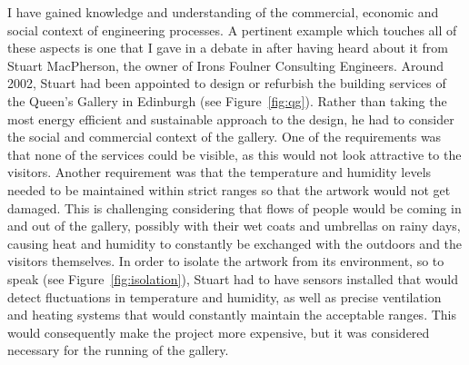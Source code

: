I have gained knowledge and understanding of the commercial, economic and social context of engineering processes.
A pertinent example which touches all of these aspects is one that I gave in a debate in \IDTitle \space after having heard about it from Stuart MacPherson, the owner of Irons Foulner Consulting Engineers.
Around 2002, Stuart had been appointed to design or refurbish the building services of the Queen's Gallery in Edinburgh (see Figure~\ref{fig:qg}).
Rather than taking the most energy efficient and sustainable approach to the design, he had to consider the social and commercial context of the gallery.
One of the requirements was that none of the services could be visible, as this would not look attractive to the visitors.
Another requirement was that the temperature and humidity levels needed to be maintained within strict ranges so that the artwork would not get damaged.
This is challenging considering that flows of people would be coming in and out of the gallery, possibly with their wet coats and umbrellas on rainy days, causing heat and humidity to constantly be exchanged with the outdoors and the visitors themselves.
In order to isolate the artwork from its environment, so to speak (see Figure~\ref{fig:isolation}), Stuart had to have sensors installed that would detect fluctuations in temperature and humidity, as well as precise ventilation and heating systems that would constantly maintain the acceptable ranges.
This would consequently make the project more expensive, but it was considered necessary for the running of the gallery.

